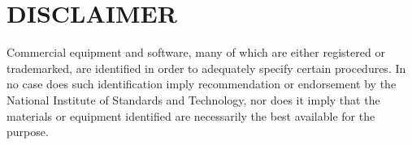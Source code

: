 \documentclass[paper=letter, fontsize=11pt]{scrartcl} %
\numberwithin{equation}{section} %
\numberwithin{figure}{section} %
\numberwithin{table}{section} %
\begin{document}








\section*{DISCLAIMER}
Commercial equipment and software, many of which are either registered or trademarked, are identified in order to adequately specify certain procedures. In no case does such identification imply recommendation or endorsement by the National Institute of Standards and Technology, nor does it imply that the materials or equipment identified are necessarily the best available for the purpose.





\end{document}
